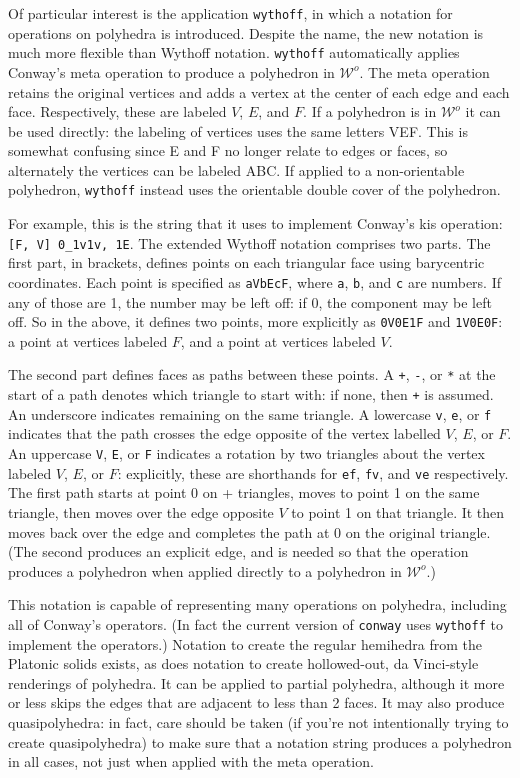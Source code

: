 \documentclass{amsart}[12pt]
\begin{document}
Of particular interest is the application \texttt{wythoff}, in which a notation
for operations on polyhedra is introduced. Despite the name, the new notation
is much more flexible than Wythoff notation. \texttt{wythoff} automatically
applies Conway's meta operation to produce a polyhedron in $\mathcal{W}^o$. The
meta operation retains the original vertices and adds a vertex at the center of
each edge and each face. Respectively, these are labeled $V$, $E$, and $F$. If
a polyhedron is in $\mathcal{W}^o$ it can be used directly: the labeling of
vertices uses the same letters VEF. This is somewhat confusing since E and F no
longer relate to edges or faces, so alternately the vertices can be labeled
ABC. If applied to a non-orientable polyhedron, \texttt{wythoff} instead uses
the orientable double cover of the polyhedron.

For example, this is the string that it uses to implement Conway's kis
operation: \texttt{[F, V] 0\_1v1v, 1E}. The extended Wythoff notation comprises
two parts. The first part, in brackets, defines points on each triangular face
using barycentric coordinates. Each point is specified as \texttt{aVbEcF}, where
\texttt{a}, \texttt{b}, and \texttt{c} are numbers. If any of those are 1, the
number may be left off: if 0, the component may be left off. So in the above,
it defines two points, more explicitly as \texttt{0V0E1F} and \texttt{1V0E0F}:
a point at vertices labeled $F$, and a point at vertices labeled $V$.

The second part defines faces as paths between these points. A \texttt{+},
\texttt{-}, or \texttt{*} at the start of a path denotes which triangle to
start with: if none, then \texttt{+} is assumed. An underscore indicates
remaining on the same triangle. A lowercase \texttt{v}, \texttt{e}, or
\texttt{f} indicates that the path crosses the edge opposite of the vertex
labelled $V$, $E$, or $F$. An uppercase \texttt{V}, \texttt{E}, or \texttt{F}
indicates a rotation by two triangles about the vertex labeled $V$, $E$, or $F$:
explicitly, these are shorthands for \texttt{ef}, \texttt{fv}, and \texttt{ve}
respectively. The first path starts at point 0 on + triangles, moves to point 1
on the same triangle, then moves over the edge opposite $V$ to point 1 on
that triangle. It then moves back over the edge and completes the path at 0
on the original triangle. (The second produces an explicit edge, and is needed
so that the operation produces a polyhedron when applied directly to a
polyhedron in $\mathcal{W}^o$.)

This notation is capable of representing many operations on polyhedra,
including all of Conway's operators. (In fact the current version of
\texttt{conway} uses \texttt{wythoff} to implement the operators.) Notation to
create the regular hemihedra from the Platonic solids exists, as does notation
to create hollowed-out, da Vinci-style renderings of polyhedra. It can be
applied to partial polyhedra, although it more or less skips the edges that
are adjacent to less than 2 faces. It may also produce quasipolyhedra: in
fact, care should be taken (if you're not intentionally trying to create
quasipolyhedra) to make sure that a notation string produces a polyhedron in
all cases, not just when applied with the meta operation.
\end{document}
